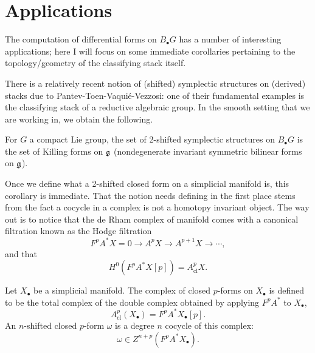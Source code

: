 \documentclass{amsart}
\begin{document}
\section{Applications}

The computation of differential forms on $B_\bullet G$ has a number of 
interesting applications; here I will focus on some immediate corollaries 
pertaining to the topology/geometry of the classifying stack itself.

There is a relatively recent notion of (shifted) symplectic structures on
(derived) stacks due to Pantev-Toen-Vaqui\'e-Vezzosi: one of their fundamental 
examples is the classifying stack of a reductive algebraic group. In the smooth 
setting that we are working in, we obtain the following.
\begin{corollary}
    For $G$ a compact Lie group,
    the set of 2-shifted symplectic structures on $B_\bullet G$ is the 
    set of Killing forms on $\mathfrak g$ (nondegenerate invariant symmetric
    bilinear forms on $\mathfrak g$).
\end{corollary}

Once we define what a 2-shifted closed form on a simplicial manifold is, this 
corollary is immediate. That the notion needs defining in the first place stems
from the fact a cocycle in a complex is not a homotopy 
invariant object. The way out is to notice that the de Rham complex of 
manifold comes with a canonical filtration known as the Hodge filtration
\begin{equation*}
    F^pA^*X = 0 \to A^pX \to A^{p+1}X \to \cdots,
\end{equation*}
and that
\begin{equation*}
    H^0(F^pA^*X[p]) = A^p_\text{cl}X.
\end{equation*}

\begin{definition}
    Let $X_\bullet$ be a simplicial manifold. The complex of closed $p$-forms on
    $X_\bullet$ is defined to be the total complex of the double complex 
    obtained by applying $F^pA^*$ to $X_\bullet$,
    \begin{equation*}
        A_\text{cl}^p(X_\bullet) = F^pA^*X_\bullet[p].
    \end{equation*}
    An $n$-shifted closed $p$-form $\omega$ is a degree $n$ cocycle of this
    complex:
    \begin{equation*}
        \omega \in Z^{n+p}(F^pA^*X_\bullet).
    \end{equation*}
\end{definition}
\end{document}
